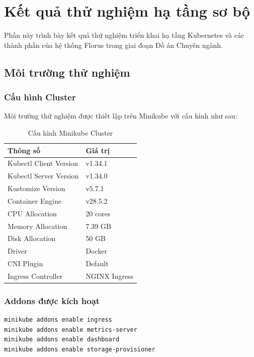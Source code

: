 \section{Kết quả thử nghiệm hạ tầng sơ bộ}

Phần này trình bày kết quả thử nghiệm triển khai hạ tầng Kubernetes và các thành phần của hệ thống Florus trong giai đoạn Đồ án Chuyên ngành.

\subsection{Môi trường thử nghiệm}

\subsubsection{Cấu hình Cluster}

Môi trường thử nghiệm được thiết lập trên Minikube với cấu hình như sau:

\begin{table}[H]
\centering
\caption{Cấu hình Minikube Cluster}
\label{tab:minikube-config}
\begin{tabular}{|l|l|}
\hline
\textbf{Thông số} & \textbf{Giá trị} \\
\hline
Kubectl Client Version & v1.34.1 \\
\hline
Kubectl Server Version & v1.34.0 \\
\hline
Kustomize Version & v5.7.1 \\
\hline
Container Engine & v28.5.2 \\
\hline
CPU Allocation & 20 cores \\
\hline
Memory Allocation & 7.39 GB \\
\hline
Disk Allocation & 50 GB \\
\hline
Driver & Docker \\
\hline
CNI Plugin & Default \\
\hline
Ingress Controller & NGINX Ingress \\
\hline
\end{tabular}
\end{table}

\subsubsection{Addons được kích hoạt}

\begin{lstlisting}[caption={Minikube Addons}]
minikube addons enable ingress
minikube addons enable metrics-server
minikube addons enable dashboard
minikube addons enable storage-provisioner
\end{lstlisting}

